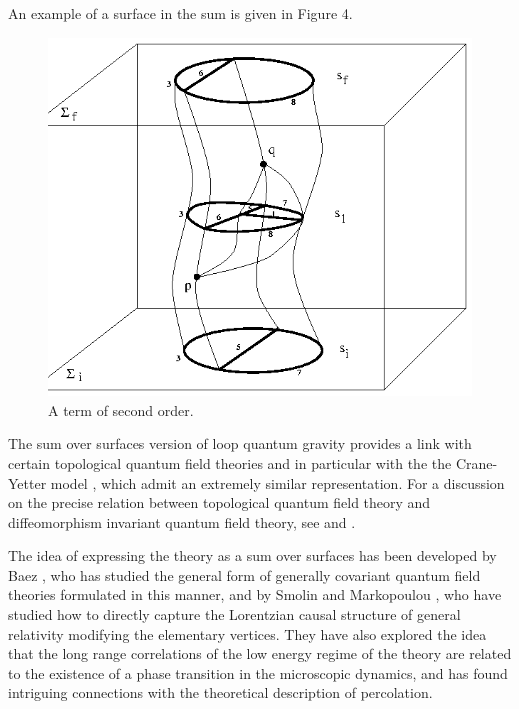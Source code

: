 \documentclass[12pt]{article}
\begin{document}
An example of a surface in the sum is given in Figure 4.

\begin{figure} \centerline{\mbox{\includegraphics{RovelliFig3.eps}}}
 \caption{A term of second order.}
\end{figure}

The sum over surfaces version of loop quantum gravity provides a 
link with certain topological quantum field theories and in 
particular with the the Crane-Yetter model 
\cite{Crane1,Crane2,CraneFrenkel,CraneKauffmanYetter,CraneYetter}, 
which admit an extremely similar representation.  For a 
discussion on the precise relation between topological quantum 
field theory and diffeomorphism invariant quantum field theory, 
see \cite{ReisenbergerRovelli} and 
\cite{RovelliPonzano,Iwasaki,Foxon}.

The idea of expressing the theory as a sum over surfaces has been 
developed by Baez \cite{Baez97}, who has studied the general form 
of generally covariant quantum field theories formulated in this 
manner, and by Smolin and Markopoulou \cite{SmolinMarkopoulo}, 
who have studied how to directly capture the Lorentzian causal 
structure of general relativity modifying the elementary 
vertices.  They have also explored the idea that the long range 
correlations of the low energy regime of the theory are related 
to the existence of a phase transition in the microscopic 
dynamics, and has found intriguing connections with the 
theoretical description of percolation.
\end{document}
